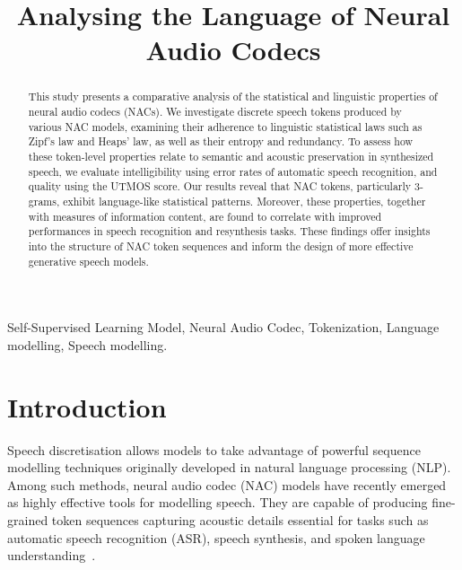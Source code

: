 \documentclass[conference]{IEEEtran}
\begin{document}
\title{Analysing the Language of Neural Audio Codecs\\
}

\author{
}


\maketitle

\begin{abstract}

This study presents a comparative analysis of the statistical and linguistic properties of neural audio codecs (NACs). We investigate discrete speech tokens produced by various NAC models, examining their adherence to linguistic statistical laws such as Zipf's law and Heaps' law, as well as their entropy and redundancy. To assess how these token-level properties relate to semantic and acoustic preservation in synthesized speech, we evaluate intelligibility using error rates of automatic speech recognition, and quality using the UTMOS score. Our results reveal that NAC tokens, particularly 3-grams, exhibit language-like statistical patterns. Moreover, these properties, together with measures of information content, are found to correlate with improved performances in speech recognition and resynthesis tasks. These findings offer insights into the structure of NAC token sequences and inform the design of more effective generative speech models.

\end{abstract}

\begin{IEEEkeywords}
Self-Supervised Learning Model, Neural Audio Codec, Tokenization, Language modelling, Speech modelling.
\end{IEEEkeywords}
\vspace{-2mm}
\section{Introduction}

Speech discretisation allows models to take advantage of powerful sequence modelling techniques originally developed in natural language processing (NLP). Among such methods, neural audio codec (NAC) models have recently emerged as highly effective tools for modelling speech. They are capable of producing fine-grained token sequences capturing acoustic details essential for tasks such as automatic speech recognition (ASR), speech synthesis, and spoken language understanding~\cite{guo2025recent, borsos23}.
\end{document}
